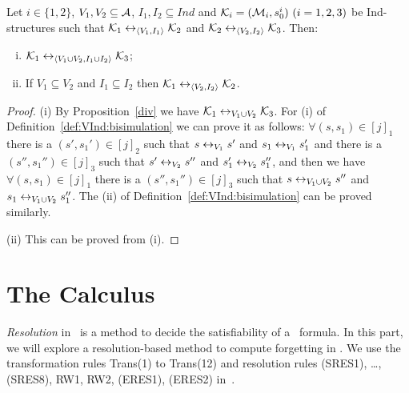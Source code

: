 \documentclass[letterpaper]{article} %
\begin{document}
\begin{proposition}\label{pro:VI:div}
Let $i\in \{1,2\}$, $V_1,V_2\subseteq\cal A$, $I_1, I_2 \subseteq Ind$
and ${\cal K}_i=({\cal M}_i,s_0^i)~(i=1,2,3)$ be Ind-structures
 such that
${\cal K}_1\leftrightarrow_{{\langle{V_1, I_1}\rangle}}{\cal K}_2$ and ${\cal K}_2\leftrightarrow_{{\langle{V_2,I_2}\rangle}}{\cal K}_3$.
 Then:
 \begin{enumerate}[(i)]
   \item ${\cal K}_1\leftrightarrow_{{\langle{V_1\cup V_2, I_1 \cup I_2}\rangle}}{\cal K}_3$;
   \item If $V_1 \subseteq V_2$ and $I_1 \subseteq I_2$ then ${\cal K}_1 \leftrightarrow_{{\langle{V_2, I_2}\rangle}} {\cal K}_2$.
 \end{enumerate}
\end{proposition}
\begin{proof}
(i) By Proposition~\ref{div} we have ${\cal K}_1\leftrightarrow_{V_1\cup V_2}{\cal K}_3$. For (i) of Definition~\ref{def:VInd:bisimulation} we can prove it as follows:
$\forall (s,s_1) \in [j]_1$ there is a $(s', s_1') \in [j]_2$ such that $s\leftrightarrow_{V_1} s'$ and $s_1 \leftrightarrow_{V_1} s_1'$ and there is a $(s'', s_1'') \in [j]_3$ such that $s'\leftrightarrow_{V_2} s''$ and $s_1' \leftrightarrow_{V_2} s_1''$, and then we have $\forall (s,s_1) \in [j]_1$ there is a $(s'', s_1'') \in [j]_3$ such that $s  \leftrightarrow_{V_1\cup V_2} s''$ and $s_1 \leftrightarrow_{V_1\cup V_2} s_1''$. The (ii) of Definition~\ref{def:VInd:bisimulation} can be proved similarly.

(ii) This can be proved from (i).
\end{proof}



\section{The Calculus}
\emph{Resolution} in \CTL\ is a method to decide the satisfiability of a \CTL\ formula.
In this part, we will explore a resolution-based method to compute forgetting in \CTL.
We use the transformation rules Trans(1) to Trans(12) and resolution rules (SRES1), \dots, (SRES8), RW1, RW2, (ERES1), (ERES2) in~\cite{zhang2009refined}.
\end{document}
